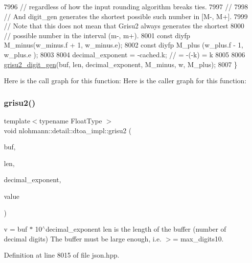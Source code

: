 \begin{DoxyCode}
7996     \textcolor{comment}{// regardless of how the input rounding algorithm breaks ties.}
7997     \textcolor{comment}{//}
7998     \textcolor{comment}{// And digit\_gen generates the shortest possible such number in [M-, M+].}
7999     \textcolor{comment}{// Note that this does not mean that Grisu2 always generates the shortest}
8000     \textcolor{comment}{// possible number in the interval (m-, m+).}
8001     \textcolor{keyword}{const} diyfp M\_minus(w\_minus.f + 1, w\_minus.e);
8002     \textcolor{keyword}{const} diyfp M\_plus (w\_plus.f  - 1, w\_plus.e );
8003 
8004     decimal\_exponent = -cached.k; \textcolor{comment}{// = -(-k) = k}
8005 
8006     \hyperlink{namespacenlohmann_1_1detail_1_1dtoa__impl_a9b899c72b0e1e3dd46d75c2b4e6bcdfb}{grisu2\_digit\_gen}(buf, len, decimal\_exponent, M\_minus, w, M\_plus);
8007 \}
\end{DoxyCode}
Here is the call graph for this function\+:
Here is the caller graph for this function\+:
\mbox{\label{namespacenlohmann_1_1detail_1_1dtoa__impl_aab7a9670a4f4704a5d0347ad7588576b}} 
\subsubsection{\texorpdfstring{grisu2()}{grisu2()}\hspace{0.1cm}{\footnotesize\ttfamily [2/2]}}
{\footnotesize\ttfamily template$<$typename Float\+Type $>$ \\
void nlohmann\+::detail\+::dtoa\+\_\+impl\+::grisu2 (\begin{DoxyParamCaption}\item[{char $\ast$}]{buf,  }\item[{int \&}]{len,  }\item[{int \&}]{decimal\+\_\+exponent,  }\item[{Float\+Type}]{value }\end{DoxyParamCaption})}

v = buf $\ast$ 10$^\wedge$decimal\+\_\+exponent len is the length of the buffer (number of decimal digits) The buffer must be large enough, i.\+e. $>$= max\+\_\+digits10. 

Definition at line 8015 of file json.\+hpp.



